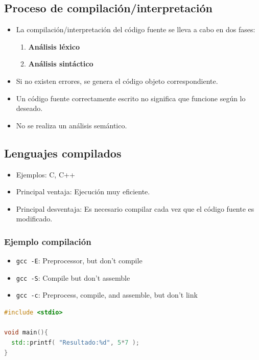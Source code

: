 \documentclass[a4paper]{article}
\begin{document}
\subsection{Proceso de compilación/interpretación}
\label{proceso-de-compilacióninterpretación}
\begin{itemize}
\item La compilación/interpretación del código fuente se lleva a cabo en dos
fases:
\begin{enumerate}
\item \textbf{Análisis léxico}
\item \textbf{Análisis sintáctico}
\end{enumerate}
\item Si no existen errores, se genera el código objeto correspondiente.
\item Un código fuente correctamente escrito no significa que funcione según
lo deseado.
\item No se realiza un análisis semántico.
\end{itemize}
\subsection{Lenguajes compilados}
\label{lenguajes-compilados}
\begin{itemize}
\item Ejemplos: C, C++
\item Principal ventaja: Ejecución muy eficiente.
\item Principal desventaja: Es necesario compilar cada vez que el código
fuente es modificado.
\end{itemize}
\subsubsection{Ejemplo compilación}
\label{sec:org0000012}
\begin{itemize}
\item \texttt{gcc -E}: Preprocessor, but don't compile
\item \texttt{gcc -S}: Compile but don't assemble
\item \texttt{gcc -c}: Preprocess, compile, and assemble, but don't link
\end{itemize}

\begin{lstlisting}[language=cpp,numbers=none]
#include <stdio>

void main(){
  std::printf( "Resultado:%d", 5*7 );
}
\end{lstlisting}
\end{document}
